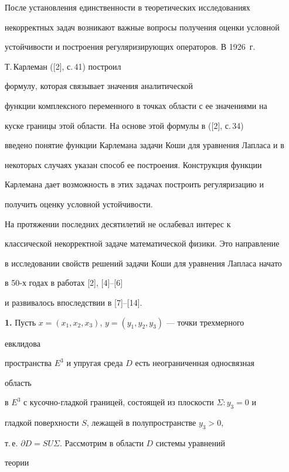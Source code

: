  


После установления единственности в теоретических исследованиях 


некорректных задач возникают важные вопросы получения оценки условной 


устойчивости и построения регуляризирующих операторов. В 1926~г. 


Т.\,Карлеман ([2], с.\,41) построил 


формулу, которая связывает значения аналитической 


функции комплексного переменного в точках области с ее значениями на 


куске границы этой области. На основе этой формулы в ([2], с.\,34) 


введено понятие функции Карлемана задачи Коши для уравнения Лапласа и в 


некоторых случаях указан способ ее построения. Конструкция функции 


Карлемана дает возможность в этих задачах построить регуляризацию и 


получить оценку условной устойчивости. 


 


На протяжении последних десятилетий не ослабевал интерес к 


классической некорректной задаче математической физики. Это направление 


в исследовании свойств решений задачи Коши для уравнения Лапласа начато 


в 50-х годах в работах [2], [4]--[6] 


и развивалось впоследствии в [7]--[14]. 


\medskip 


 


{\bf 1.} Пусть $x=(x_1,x_2,x_3)$, $y=(y_1,y_2,y_3)$ --- точки трехмерного 


евклидова 


пространства $E^3$ и упругая среда $D$ есть неограниченная односвязная 


область 


в $E^3$ с кусочно-гладкой границей, состоящей из плоскости $\Sigma:y_3=0$ и 


гладкой поверхности $S$, лежащей в полупространстве $y_3>0$, 


т.\,е. $\partial D=SU\Sigma$. Рассмотрим в области $D$ системы уравнений 


теории 


